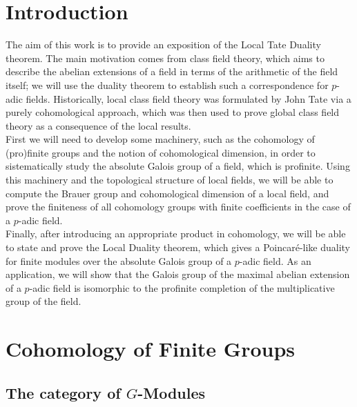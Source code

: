 \documentclass[a4paper, oneside]{memoir}
\begin{document}
\tableofcontents

\chapter*{Introduction}
The aim of this work is to provide an exposition of the Local Tate Duality theorem. The main motivation comes from class field theory, which aims to describe the abelian
extensions of a field in terms of the arithmetic of the field itself; we will use the duality theorem to establish such a correspondence for $p$-adic fields. Historically, local class field theory was formulated by John Tate via a purely cohomological approach,
which was then used to prove global class field theory as a consequence of the local results.\\

First we will need to develop some machinery, such as the cohomology of (pro)finite groups and the notion of cohomological dimension, in order to sistematically study the absolute Galois group of
a field, which is profinite. Using this machinery and the topological structure of local fields, we will be able to compute the Brauer group and cohomological dimension of a local field, and prove the
finiteness of all cohomology groups with finite coefficients in the case of a $p$-adic field.\\

Finally, after introducing an appropriate product in cohomology, we will be able to state and prove the Local Duality theorem, which gives a Poincaré-like duality for finite modules over the
absolute Galois group of a $p$-adic field. As an application, we will show that the Galois group of the maximal abelian extension of a $p$-adic field is isomorphic to the profinite
completion of the multiplicative group of the field.\\



\chapter{Cohomology of Finite Groups}

\section{The category of $G$-Modules}
\end{document}
